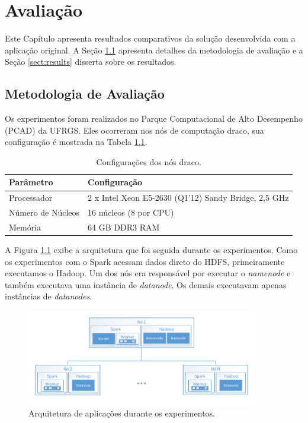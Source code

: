 \chapter{Avaliação} \label{ch:evaluation}

Este Capítulo apresenta resultados comparativos da solução desenvolvida com a 
aplicação original. A Seção \ref{sect:methodology} apresenta detalhes da 
metodologia de avaliação e a Seção \ref{sect:results} disserta sobre os 
resultados.


\section{Metodologia de Avaliação} \label{sect:methodology}

Os experimentos foram realizados no Parque Computacional de Alto Desempenho 
(PCAD) da UFRGS. Eles ocorreram nos nós de computação draco, sua 
configuração é mostrada na Tabela \ref{tab:draco_config}.


\begin{table}[H]
\centering
\begin{tabular}{l l} \toprule
\textbf{Parâmetro}  &  \textbf{Configuração} \\ 
\midrule
Processador     & 2 x Intel Xeon E5-2630 (Q1'12) Sandy Bridge, 2,5 GHz  
\\
Número de Núcleos    & 16 núcleos (8 por CPU)  \\
Memória       & 64 GB DDR3 RAM   \\
\end{tabular}
\caption{Configurações dos nós draco.}
\label{tab:draco_config}
\end{table}


A Figura \ref{fig:experiment_arch} exibe a arquitetura que foi seguida durante 
os experimentos. Como os experimentos com o Spark acessam dados direto do HDFS, 
primeiramente executamos o Hadoop. Um dos nós era responsável por executar o 
\emph{namenode} e também executava uma instância de \emph{datanode}. Os demais 
executavam apenas instâncias de \emph{datanodes}.


\begin{figure}[ht]
\centerline{
\includegraphics[width=0.9\textwidth]{./img/experiments_arch.pdf}}
 \caption{Arquitetura de aplicações durante os experimentos.}
 \label{fig:experiment_arch}
\end{figure}


